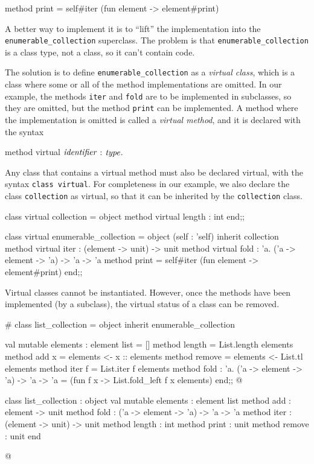 \begin{ocaml}
   method print = self#iter (fun element -> element#print)
\end{ocaml}
%
A better way to implement it is to ``lift'' the implementation into the \hbox{\lstinline/enumerable_collection/}
superclass.  The problem is that \hbox{\lstinline/enumerable_collection/} is a class type, not a class, so
it can't contain code.

The solution is to define \hbox{\lstinline/enumerable_collection/} as a \emph{virtual class}, which is a
class where some or all of the method implementations are omitted.  In our example, the
methods \hbox{\lstinline/iter/} and \hbox{\lstinline/fold/} are to be implemented in subclasses, so they are
omitted, but the method \hbox{\lstinline/print/} can be implemented.  A method where the implementation is
omitted is called a \emph{virtual method}, and it is declared with the syntax

\label{keyword:virtual}
\begin{ocaml}
method virtual $\textit{\rmfamily identifier}$ : $\textit{\rmfamily type}$.
\end{ocaml}
%
Any class that contains a virtual method must also be declared virtual, with the
syntax \hbox{\lstinline/class virtual/}.  For completeness in our example, we also declare the
class \hbox{\lstinline/collection/} as virtual, so that it can be inherited by the \hbox{\lstinline/collection/}
class.

\begin{ocaml}
class virtual collection =
object
   method virtual length : int
end;;

class virtual enumerable_collection =
object (self : 'self)
   inherit collection
   method virtual iter : (element -> unit) -> unit
   method virtual fold : 'a. ('a -> element -> 'a) -> 'a -> 'a
   method print = self#iter (fun element -> element#print)
end;;
\end{ocaml}
%
Virtual classes cannot be instantiated.  However, once the methods have been implemented (by a
subclass), the virtual status of a class can be removed.

\begin{ocaml}
# class list_collection =
  object
     inherit enumerable_collection

     val mutable elements : element list = []
     method length = List.length elements
     method add x = elements <- x :: elements
     method remove = elements <- List.tl elements
     method iter f = List.iter f elements
     method fold : 'a. ('a -> element -> 'a) -> 'a -> 'a =
        (fun f x -> List.fold_left f x elements)
  end;;
@
\begin{topoutput}
class list_collection :
  object
    val mutable elements : element list
    method add : element -> unit
    method fold : ('a -> element -> 'a) -> 'a -> 'a
    method iter : (element -> unit) -> unit
    method length : int
    method print : unit
    method remove : unit
  end
\end{topoutput}
@
\end{ocaml}

